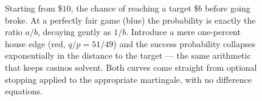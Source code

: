 \begin{figure}[H]
\centering
{}
\caption{Starting from \$$10$, the chance of reaching a target \$$b$ before going broke. At a perfectly
fair game (blue) the probability is exactly the ratio $a/b$, decaying gently as $1/b$. Introduce a mere
one-percent house edge (red, $q/p = 51/49$) and the success probability collapses exponentially in the
distance to the target --- the same arithmetic that keeps casinos solvent. Both curves come straight
from optional stopping applied to the appropriate martingale, with no difference equations.}
\label{ch28:fig-ruin}
\end{figure}

